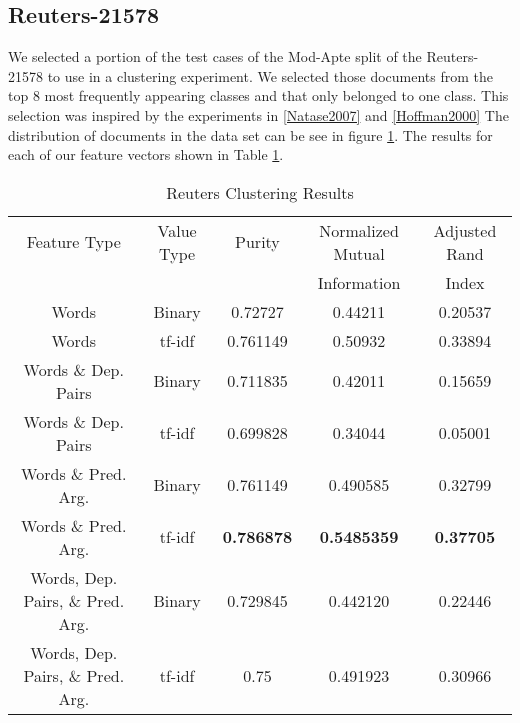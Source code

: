 \documentclass[11pt]{article}
\newcommand{\headcol}{\rowcolor{tableheadcolor}} %
\begin{document}
\subsection{Reuters-21578}

We selected a portion of the test cases of the Mod-Apte split of the Reuters-21578 to use in a clustering experiment. We selected those documents from the top 8 most frequently appearing classes and that only belonged to one class. This selection was inspired by the experiments in \ref{Natase2007} and \ref{Hoffman2000} The distribution of documents in the data set can be see in figure \ref{fig:ReutersClassDist}. The results for each of our feature vectors shown in Table \ref{tbl:ReutersClusteringResults}. 

\begin{figure}[H]
\label{fig:ReutersClassDist}
\centering
{}
\end{figure}

\begin{table}[H]
\caption{Reuters Clustering Results}
\label{tbl:ReutersClusteringResults}
\begin{tabular}{|c|c|c|c|c|}
\hline
\headcol \color{white} Feature Type & \color{white} Value Type & \color{white} Purity & \color{white} Normalized Mutual  & \color{white} Adjusted Rand  \\
 \headcol & & &  \color{white} Information & \color{white}  Index \\
\hline
Words & Binary & 0.72727 & 0.44211 &  0.20537  \\
Words & tf-idf &  0.761149  & 0.50932 & 0.33894\\
Words \& Dep. Pairs & Binary & 0.711835 & 0.42011 & 0.15659 \\
Words \& Dep. Pairs & tf-idf & 0.699828 & 0.34044 & 0.05001 \\
Words \& Pred. Arg. & Binary & 0.761149 & 0.490585 & 0.32799 \\
Words \& Pred. Arg.  & tf-idf & \textbf{0.786878} & \textbf{0.5485359} & \textbf{0.37705} \\
Words, Dep. Pairs, \& Pred. Arg. & Binary & 0.729845 & 0.442120 & 0.22446 \\
Words, Dep. Pairs, \& Pred. Arg.& tf-idf & 0.75 & 0.491923 & 0.30966 \\
\hline
\end{tabular}
\end{table}
\end{document}
